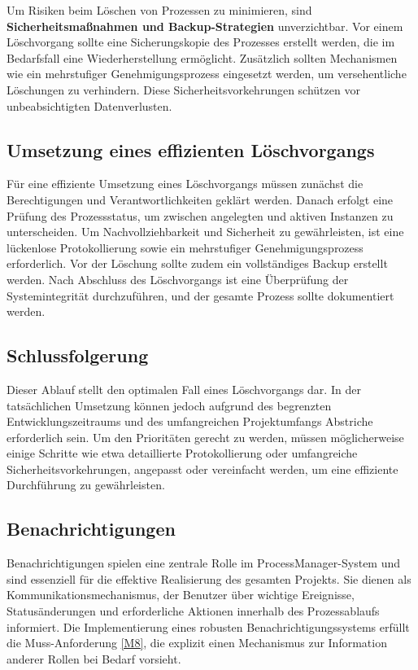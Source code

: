 Um Risiken beim Löschen von Prozessen zu minimieren, sind \textbf{Sicherheitsmaßnahmen und Backup-Strategien} unverzichtbar. Vor einem Löschvorgang sollte eine Sicherungskopie des Prozesses erstellt werden, die im Bedarfsfall eine Wiederherstellung ermöglicht. Zusätzlich sollten Mechanismen wie ein mehrstufiger Genehmigungsprozess eingesetzt werden, um versehentliche Löschungen zu verhindern. Diese Sicherheitsvorkehrungen schützen vor unbeabsichtigten Datenverlusten.

\subsection*{Umsetzung eines effizienten Löschvorgangs}
Für eine effiziente Umsetzung eines Löschvorgangs müssen zunächst die Berechtigungen und Verantwortlichkeiten geklärt werden. Danach erfolgt eine Prüfung des Prozessstatus, um zwischen angelegten und aktiven Instanzen zu unterscheiden. Um Nachvollziehbarkeit und Sicherheit zu gewährleisten, ist eine lückenlose Protokollierung sowie ein mehrstufiger Genehmigungsprozess erforderlich. Vor der Löschung sollte zudem ein vollständiges Backup erstellt werden. Nach Abschluss des Löschvorgangs ist eine Überprüfung der Systemintegrität durchzuführen, und der gesamte Prozess sollte dokumentiert werden.

\subsection*{Schlussfolgerung}
Dieser Ablauf stellt den optimalen Fall eines Löschvorgangs dar. In der tatsächlichen Umsetzung können jedoch aufgrund des begrenzten Entwicklungszeitraums und des umfangreichen Projektumfangs Abstriche erforderlich sein. Um den Prioritäten gerecht zu werden, müssen möglicherweise einige Schritte wie etwa detaillierte Protokollierung oder umfangreiche Sicherheitsvorkehrungen, angepasst oder vereinfacht werden, um eine effiziente Durchführung zu gewährleisten.

\subsection{Benachrichtigungen} \label{Benachrichtigungen}
Benachrichtigungen spielen eine zentrale Rolle im ProcessManager-System und sind essenziell für die effektive Realisierung des gesamten Projekts. Sie dienen als Kommunikationsmechanismus, der Benutzer über wichtige Ereignisse, Statusänderungen und erforderliche Aktionen innerhalb des Prozessablaufs informiert. Die Implementierung eines robusten Benachrichtigungssystems erfüllt die Muss-Anforderung \ref{M8}, die explizit einen Mechanismus zur Information anderer Rollen bei Bedarf vorsieht.

